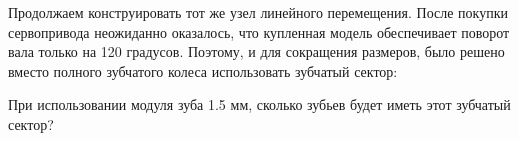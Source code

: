 
Продолжаем конструировать тот же узел линейного перемещения.   После покупки сервопривода неожиданно оказалось, что купленная модель обеспечивает поворот вала только на 120 градусов.  Поэтому, и для сокращения размеров, было решено вместо полного зубчатого колеса использовать зубчатый сектор:


При использовании модуля зуба 1.5 мм,  сколько зубьев будет иметь этот зубчатый сектор?